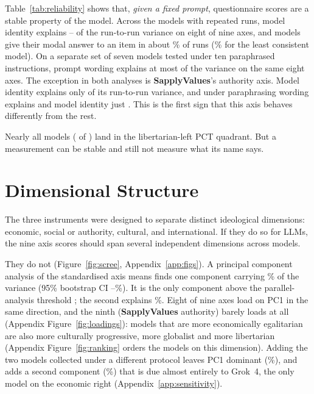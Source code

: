 \documentclass[11pt]{article}
\newcommand{\instSAP}[1]{\textcolor{cSAP}{\textbf{#1}}}
\newcommand{\sap}{\instSAP{SapplyValues}\xspace}
\begin{document}
Table~\ref{tab:reliability} shows that, \emph{given a fixed prompt}, questionnaire scores are a stable property of the model. Across the \nNModelsMulti{} models with repeated runs, model identity explains \nEtaMinOther--\nEtaMax{} of the run-to-run variance on eight of nine axes, and models give their modal answer to an item in about \nAgreeMean\% of runs (\nAgreeMinModel\% for the least consistent model). On a separate set of seven models tested under ten paraphrased instructions, prompt wording explains at most \nPromptEtaMax{} of the variance on the same eight axes. The exception in both analyses is \sap's authority axis. Model identity explains only \nEtaSapAuth{} of its run-to-run variance, and under paraphrasing wording explains \nPromptEtaSapAuth{} and model identity just \nModelEtaSapAuth{}. This is the first sign that this axis behaves differently from the rest.

Nearly all models (\nLibLeftCount{} of \nNModels) land in the libertarian-left PCT quadrant. But a measurement can be stable and still not measure what its name says.

\section{Dimensional Structure}
\label{sec:dimensionality}

The three instruments were designed to separate distinct ideological dimensions: economic, social or authority, cultural, and international. If they do so for LLMs, the nine axis scores should span several independent dimensions across models.

They do not (Figure~\ref{fig:scree}, Appendix~\ref{app:figs}). A principal component analysis of the standardised axis means finds one component carrying \nPCOneShare\% of the variance (95\% bootstrap CI \nPCOneLo--\nPCOneHi\%). It is the only component above the parallel-analysis threshold \citep{horn1965rationale}; the second explains \nPCTwoShare\%. Eight of nine axes load on PC1 in the same direction, and the ninth (\sap authority) barely loads at all (Appendix Figure~\ref{fig:loadings}): models that are more economically egalitarian are also more culturally progressive, more globalist and more libertarian (Appendix Figure~\ref{fig:ranking} orders the models on this dimension). Adding the two models collected under a different protocol leaves PC1 dominant (\nSPCOne\%), and adds a second component (\nSPCTwo\%) that is due almost entirely to Grok~4, the only model on the economic right (Appendix~\ref{app:sensitivity}).
\end{document}
